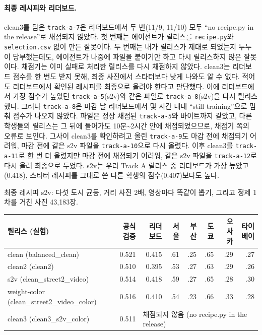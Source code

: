 \documentclass[11pt]{article}
\begin{document}
\paragraph{최종 레시피와 리더보드.} clean3를 담은 \texttt{track-a-7}은 리더보드에서 두 번(11/9, 11/10) 모두 ``no recipe.py in the release''로 채점되지 않았다. 첫 번째는 에이전트가 릴리스를 \texttt{recipe.py}와 \texttt{selection.csv} 없이 만든 잘못이다. 두 번째는 내가 릴리스가 제대로 되었는지 누누이 당부했는데도, 에이전트가 나중에 파일을 붙이기만 하고 다시 릴리스하지 않은 잘못이다. 채점기는 이미 실패로 처리한 릴리스를 다시 채점하지 않았다. clean3는 리더보드 점수를 한 번도 받지 못해, 최종 사진에서 스타터보다 낮게 나와도 알 수 없다. 적어도 리더보드에서 확인된 레시피를 최종으로 올려야 한다고 판단했다. 이에 리더보드에서 가장 점수가 높았던 \texttt{track-a-5}(s2v)와 같은 파일로 \texttt{track-a-8}(s2v)을 다시 릴리스했다. 그러나 \texttt{track-a-8}은 마감 날 리더보드에서 몇 시간 내내 ``still training''으로 멈춰 점수가 나오지 않았다. 파일은 정상 채점된 \texttt{track-a-5}와 바이트까지 같았고, 다른 학생들의 릴리스는 그 뒤에 들어가도 10분\textasciitilde 2시간 안에 채점되었으므로, 채점기 쪽의 오류로 보인다. 그사이 clean3를 확인하려고 올린 \texttt{track-a-9}도 마감 전에 채점되기 어려워, 마감 전에 같은 s2v 파일을 \texttt{track-a-10}으로 다시 올렸다. 이후 clean3를 \texttt{track-a-11}로 한 번 더 올렸지만 마감 전에 채점되기 어려워, 같은 s2v 파일을 \texttt{track-a-12}로 다시 올려 최종으로 두었다. s2v는 우리 Track A 릴리스 중 리더보드가 가장 높았고(0.418), 스타터 레시피를 그대로 쓴 다른 학생의 점수(0.407)보다도 높다.

최종 레시피 s2v: 다섯 도시 균등, 거리 사진 2배, 영상마다 똑같이 뽑기, 그리고 정제 1차를 거친 사진 43,183장.

\begin{center}\footnotesize
\begin{tabular}{lrrrrrrr}
\toprule
릴리스 (실험) & 공식 검증 & 리더보드 & 서울 & 부산 & 도쿄 & 오사카 & 타이베이 \\
\midrule
clean (balanced\_clean) & 0.521 & 0.415 & .61 & .25 & .65 & .29 & .27 \\
clean2 (clean2) & 0.510 & 0.395 & .53 & .27 & .63 & .29 & .26 \\
s2v (clean\_street2\_video) & 0.514 & 0.418 & .59 & .27 & .65 & .28 & .30 \\
weight-color (clean\_street2\_video\_color) & 0.516 & 0.410 & .54 & .23 & .66 & .33 & .28 \\
clean3 (clean3\_s2v\_color) & 0.511 & \multicolumn{6}{l}{채점되지 않음 (no recipe.py in the release)} \\
\bottomrule
\end{tabular}
\end{center}
\end{document}
